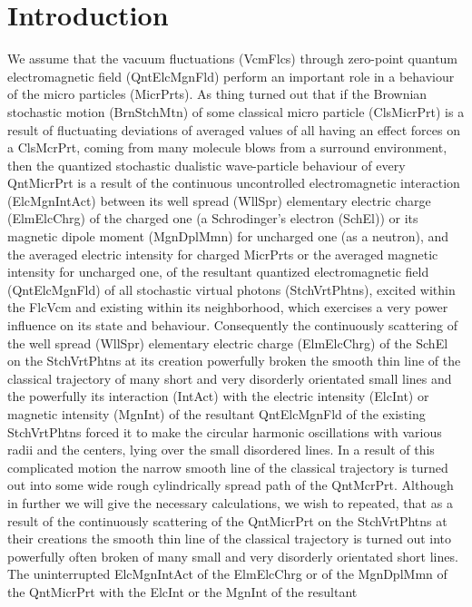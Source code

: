 \documentclass[12pt]{article}
\begin{document}
\section{ Introduction}

 We assume that the vacuum fluctuations (VcmFlcs) through zero-point quantum
electromagnetic field (QntElcMgnFld) perform an important role in a behaviour
of the micro particles (MicrPrts). As thing turned out that if the Brownian
stochastic motion (BrnStchMtn) of some classical micro particle (ClsMicrPrt)
is a result of fluctuating deviations of averaged values of all having an
effect forces on a ClsMcrPrt, coming from many molecule blows from a surround
environment, then the quantized stochastic dualistic wave-particle behaviour
of every QntMicrPrt is a result of the continuous uncontrolled electromagnetic
interaction (ElcMgnIntAct) between its well spread (WllSpr) elementary
electric charge (ElmElcChrg) of the charged one (a Schrodinger's electron
(SchEl)) or its magnetic dipole moment (MgnDplMmn) for uncharged one (as a
neutron), and the averaged electric intensity for charged MicrPrts or the
averaged magnetic intensity for uncharged one, of the resultant quantized
electromagnetic field (QntElcMgnFld) of all stochastic virtual photons
(StchVrtPhtns), excited within the FlcVcm and existing within its
neighborhood, which exercises a very power influence on its state and
behaviour. Consequently the continuously scattering of the well spread
(WllSpr) elementary electric charge (ElmElcChrg) of the SchEl on the
StchVrtPhtns at its creation powerfully broken the smooth thin line of
the classical trajectory of many short and very disorderly orientated
small lines and the powerfully its interaction (IntAct) with the electric
intensity (ElcInt) or magnetic intensity (MgnInt) of the resultant
QntElcMgnFld of the existing StchVrtPhtns forced it to make the circular
harmonic oscillations with various radii and the centers, lying over the
small disordered lines. In a result of this complicated motion the narrow
smooth line of the classical trajectory is turned out into some wide rough
cylindrically spread path of the QntMcrPrt. Although in further we will
give the necessary calculations, we wish to repeated, that as a result of
the continuously scattering of the QntMicrPrt on the StchVrtPhtns at their
creations the smooth thin line of the classical trajectory is turned out
into powerfully often broken of many small and very disorderly orientated
short lines. The uninterrupted ElcMgnIntAct of the ElmElcChrg or of the
MgnDplMmn of the QntMicrPrt with the ElcInt or the MgnInt of the resultant
\end{document}
